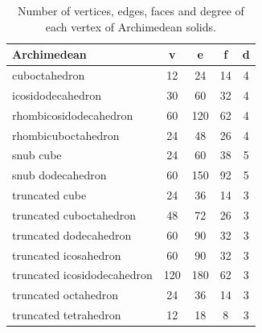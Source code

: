 \begin{table}[H]
    \centering
    \caption{Number of vertices, edges, faces and degree of each vertex of Archimedean solids.}
    \vspace{5pt}
    \label{tab:archimedean-basic-props}
    \begin{tabular}{|l|c|c|c|c|}
    \hline
    Archimedean & v & e & f & d \\
    \hline\hline
    cuboctahedron & 12 & 24 & 14 & 4 \\
    \hline
    icosidodecahedron & 30 & 60 & 32 & 4 \\
    \hline
    rhombicosidodecahedron & 60 & 120 & 62 & 4 \\
    \hline
    rhombicuboctahedron & 24 & 48 & 26 & 4 \\
    \hline
    snub cube & 24 & 60 & 38 & 5 \\
    \hline
    snub dodecahedron & 60 & 150 & 92 & 5 \\
    \hline
    truncated cube & 24 & 36 & 14 & 3 \\
    \hline
    truncated cuboctahedron & 48 & 72 & 26 & 3 \\
    \hline
    truncated dodecahedron & 60 & 90 & 32 & 3 \\
    \hline
    truncated icosahedron & 60 & 90 & 32 & 3 \\
    \hline
    truncated icosidodecahedron & 120 & 180 & 62 & 3 \\
    \hline
    truncated octahedron & 24 & 36 & 14 & 3 \\
    \hline
    truncated tetrahedron & 12 & 18 & 8 & 3 \\
    \hline
    \end{tabular}
\end{table}

